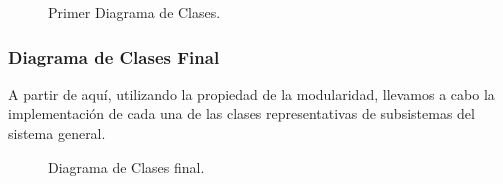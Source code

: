\documentclass[12pt]{article} %
\begin{document}
\begin{figure}[H] %
\caption{Primer Diagrama de Clases.}
\label{fig:speciation}
\end{figure}

\subsubsection{Diagrama de Clases Final}
A partir de  aquí, utilizando la  propiedad de la modularidad, llevamos a cabo la  implementación de  cada una de las clases representativas de subsistemas del sistema general.

\begin{figure}[H] %
\caption{Diagrama de Clases final.}
\label{fig:speciation}
\end{figure}
\end{document}
